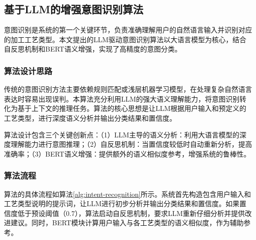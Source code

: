 \documentclass[preprint,12pt]{elsarticle}
\begin{document}

\subsection{基于LLM的增强意图识别算法}

意图识别是系统的第一个关键环节，负责准确理解用户的自然语言输入并识别对应的加工工艺类型。本文提出的LLM驱动意图识别算法以大语言模型为核心，结合自反思机制和BERT语义增强，实现了高精度的意图分类。

\subsubsection{算法设计思路}

传统的意图识别方法主要依赖规则匹配或浅层机器学习模型，在处理复杂自然语言表达时容易出现误判。本算法充分利用LLM的强大语义理解能力，将意图识别转化为基于上下文的推理任务。算法的核心思想是让LLM根据用户输入和预定义的工艺类型，进行深度语义分析并输出分类结果和置信度。

算法设计包含三个关键创新点：（1）LLM主导的语义分析：利用大语言模型的深度理解能力进行意图推理；（2）自反思机制：当置信度较低时自动重新分析，提高准确率；（3）BERT语义增强：提供额外的语义相似度参考，增强系统的鲁棒性。

\subsubsection{算法流程}

算法的具体流程如算法\ref{alg:intent-recognition}所示。系统首先构造包含用户输入和工艺类型说明的提示词，让LLM进行初步分析并输出分类结果和置信度。如果置信度低于预设阈值（0.7），算法启动自反思机制，要求LLM重新仔细分析并提供改进建议。同时，BERT模块计算用户输入与各工艺类型的语义相似度，作为辅助参考。
\end{document}
